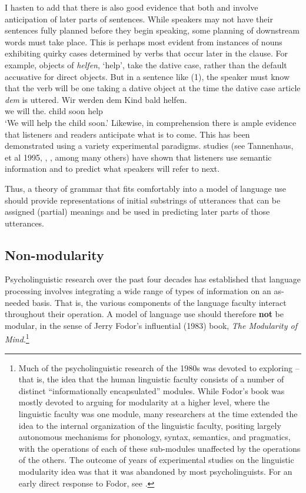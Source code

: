 \documentclass[a4paper]{article}
\begin{document}
I hasten to add that there is also good evidence that both  and  involve anticipation of later parts of sentences.  While speakers may not have their sentences fully planned before they begin speaking, some planning of downstream words must take place.  This is perhaps most evident from instances of nouns exhibiting quirky cases determined by verbs that occur later in the clause.  For example, objects of  {\it helfen}, `help', take the dative case, rather than the default accusative for direct objects.  But in a sentence like (1), the speaker must know that the verb will be one taking a dative object at the time the dative case article {\it dem} is uttered.
\ea
\gll Wir werden dem        Kind bald helfen.\\
     we will    the.\DAT{} child soon help\\\german
\glt `We will help the child soon.'
\z
Likewise, in comprehension there is ample evidence that listeners and readers anticipate what is to come.  This has been demonstrated using a variety experimental paradigms.   studies (see Tannenhaus, et al 1995, \citealt{AltmannKamide99}, \citealt{ArnoldEtal2007}, among many others) have shown that listeners use semantic information and  to predict what speakers will refer to next.

Thus, a theory of grammar that fits comfortably into a model of language use should provide representations of initial substrings of utterances that can be assigned (partial) meanings and be used in predicting later parts of those utterances.

\subsection{Non-modularity}

Psycholinguistic research over the past four decades has established that language processing involves integrating a wide range of types of information on an as-needed basis.  That is, the
various components of the language faculty interact throughout their operation.  A model of language use should therefore {\bf not} be modular, in the sense of  Jerry Fodor's influential (1983) book, {\it The Modularity of Mind}.\footnote{Much of the psycholinguistic research of the 1980s was devoted to exploring  -- that is, the idea that the human linguistic faculty consists of a number of distinct ``informationally encapsulated'' modules.  While Fodor's book was mostly devoted to arguing for modularity at a higher level, where the linguistic faculty was one module, many researchers at the time extended the idea to the internal organization of the linguistic faculty, positing largely autonomous mechanisms for phonology, syntax, semantics, and pragmatics, with the operations of each of these sub-modules unaffected by the operations of the others. The outcome of years of experimental studies on the linguistic modularity idea was that it was abandoned by most psycholinguists. For an early direct response to Fodor, see \citet{MarslenTyler87}.}
\end{document}
